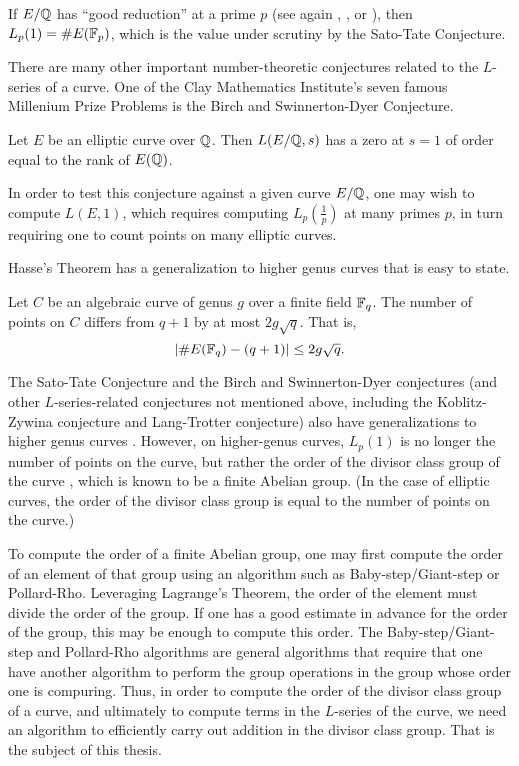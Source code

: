 If $E/\mathbb{Q}$ has ``good reduction'' at a prime $p$
(see again \cite{husemoller87}, \cite{milne06}, or \cite{silverman09}),
then $L_p(1) = \#E(\mathbb{F}_p)$, which is the value under scrutiny by the Sato-Tate Conjecture.

There are many other important number-theoretic conjectures related to the $L$-series of a curve.
One of the Clay Mathematics Institute's seven famous Millenium Prize Problems
is the Birch and Swinnerton-Dyer Conjecture.

\begin{conjecture}
  Let $E$ be an elliptic curve over $\mathbb{Q}$.
  Then $L(E/\mathbb{Q}, s)$ has a zero at $s = 1$ of order equal to the rank of $E(\mathbb{Q})$.
\end{conjecture}

In order to test this conjecture against a given curve $E/\mathbb{Q}$,
one may wish to compute $L(E, 1)$, which requires computing $L_p(\frac 1 p)$ at many primes $p$,
in turn requiring one to count points on many elliptic curves.

Hasse's Theorem has a generalization to higher genus curves that is easy to state.
\begin{theorem}
  Let $C$ be an algebraic curve of genus $g$ over a finite field $\mathbb{F}_q$.
  The number of points on $C$ differs from $q + 1$ by at most $2g \sqrt q$.
  That is,
  \[ | \#E(\mathbb{F}_q) - (q + 1) | \leq 2g \sqrt q. \]
\end{theorem}

The Sato-Tate Conjecture and the Birch and Swinnerton-Dyer conjectures
(and other $L$-series-related conjectures not mentioned above,
including the Koblitz-Zywina conjecture and Lang-Trotter conjecture)
also have generalizations to higher genus curves \cite{sutherland16-2} \cite{sutherland-18}.
However, on higher-genus curves, $L_p(1)$ is no longer the number of points on the curve,
but rather the order of the divisor class group of the curve \cite{sutherland08},
which is known to be a finite Abelian group.
(In the case of elliptic curves, the order of the divisor class group is
equal to the number of points on the curve.)

To compute the order of a finite Abelian group, one may first compute the order of an element of that group
using an algorithm such as Baby-step/Giant-step or Pollard-Rho.
Leveraging Lagrange's Theorem, the order of the element must divide the order of the group.
If one has a good estimate in advance for the order of the group, this may be enough
to compute this order.
The Baby-step/Giant-step and Pollard-Rho algorithms are general algorithms that
require that one have another algorithm to perform the group operations in the group
whose order one is compuring.
Thus, in order to compute the order of the divisor class group of a curve,
and ultimately to compute terms in the $L$-series of the curve,
we need an algorithm to efficiently carry out addition in the divisor class group.
That is the subject of this thesis.



